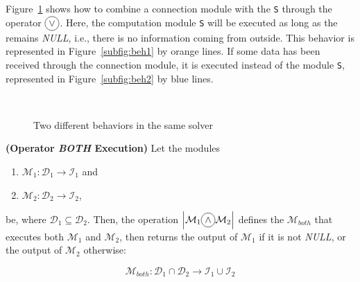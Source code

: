Figure~\ref{fig:2difBeh} shows how to combine a connection module with the \om{} \verb!S! through the operator $\circled{$\vee$}$. Here, the computation module \verb!S! will be executed as long as the \opch{} remains \textit{NULL}, i.e., there is no information coming from outside. This behavior is represented in Figure~\ref{subfig:beh1} by orange lines. If some data has been received through the connection module, it is executed instead of the module \verb!S!, represented in Figure~\ref{subfig:beh2} by blue lines.

\begin{figure}[h]
\centering
{}\\
\caption[]{Two different behaviors in the same solver}
\label{fig:2difBeh}
\end{figure}


\begin{definition}\label{op:and}
{\bf (Operator {\it BOTH} Execution)} Let the modules
\begin{enumerate}%
	\item $\mathcal{M}_1 : \mathcal{D}_1 \rightarrow \mathcal{I}_1$ and  
	\item $\mathcal{M}_2 : \mathcal{D}_2 \rightarrow \mathcal{I}_2$,
\end{enumerate}%
be, where $\mathcal{D}_1 \subseteq \mathcal{D}_2$. %
Then, the operation $\left|\mathcal{M}_1\circled{$\wedge$}\mathcal{M}_2\right|$ defines the \cm{} $\mathcal{M}_{both}$ that executes both $\mathcal{M}_1$ and $\mathcal{M}_2$, then returns the output of $\mathcal{M}_1$ if it is not {\it NULL}, or the output of $\mathcal{M}_2$ otherwise:

\[
\mathcal{M}_{both}:\mathcal{D}_1\cap\mathcal{D}_2 \rightarrow \mathcal{I}_1 \cup \mathcal{I}_2 
\]
\end{definition}

